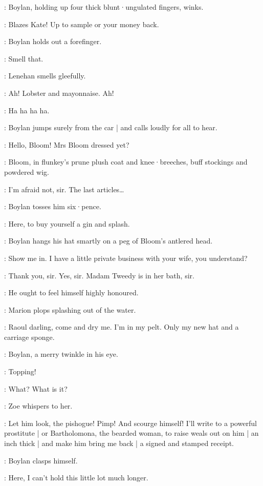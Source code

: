 :
Boylan,
holding up four thick blunt·ungulated fingers,
winks.

\Boylan:
Blazes Kate!
Up to sample or your money back.

:
Boylan holds out a forefinger.

\Boylan:
Smell that.

:
Lenehan smells gleefully.

\Lenehan:
Ah!
Lobster and mayonnaise.
Ah!

\ZoeAndFlorry:
Ha ha ha ha.

:
Boylan jumps surely from the car |
and calls loudly for all to hear.

\Boylan:
Hello,
Bloom!
Mrs Bloom dressed yet?

:
Bloom,
in flunkey's prune plush coat and knee·breeches,
%
buff stockings and powdered wig.

\Bloom:
I'm afraid not,
sir.
The last articles…

:
Boylan tosses him six·pence.

\Boylan:
Here,
to buy yourself a gin and splash.

:
Boylan hangs his hat smartly on a peg of Bloom's antlered head.

\Boylan:
Show me in.
I have a little private business with your wife,
you understand?

\Bloom:
Thank you,
sir.
Yes,
sir.
Madam Tweedy is in her bath,
sir.

\Marion[1]:
He ought to feel himself highly honoured.

:
Marion plops splashing out of the water.

\Marion:
Raoul darling,
come and dry me.
I'm in my pelt.
%
Only my new hat and a carriage sponge.

:
Boylan,
a merry twinkle in his eye.

\Boylan:
Topping!

\Bella:
What?
What is it?

:
Zoe whispers to her.

\Marion:
Let him look,
the pishogue!
Pimp!
And scourge himself!
I'll write to a powerful prostitute |
or Bartholomona,
the bearded woman,
to raise weals out on him |
an inch thick |
%
and make him bring me back |
a signed and stamped receipt.

:
Boylan clasps himself.

\Boylan:
Here,
I can't hold this little lot much longer.

